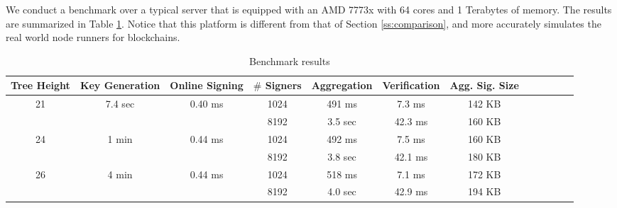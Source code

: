 We conduct a benchmark over a typical server that is equipped with an AMD 7773x with
64 cores and 1 Terabytes of memory.
The results are summarized in Table \ref{tab:bench_results}.
Notice that this platform is different from that of Section \ref{ss:comparison},
and more accurately simulates the real world node runners for blockchains.

\begin{table}[t]\centering
  \begin{tabular}{|c|c|c|c|c|c|c|c|c||c|c|c|}\hline
      Tree Height         & Key Generation            & Online Signing\footnotemark        
      & $\#$ Signers  
                                                                                            &  Aggregation & Verification  & Agg. Sig. Size  \\ \hline\hline
      \multirow{2}{*}{21} & \multirow{2}{*}{7.4 sec}  & \multirow{2}{*}{0.40 ms}  & 1024    &   491 ms     &  7.3 ms       & 142 KB     \\\cline{4-7}
                          &                           &                           & 8192    &   3.5 sec    &  42.3 ms      & 160 KB     \\\hline\hline

      \multirow{2}{*}{24} & \multirow{2}{*}{1 min}    & \multirow{2}{*}{0.44 ms}  & 1024    &   492 ms     &  7.5 ms       & 160 KB     \\\cline{4-7}
                          &                           &                           & 8192    &   3.8 sec    &  42.1 ms      & 180 KB     \\\hline\hline

      \multirow{2}{*}{26} & \multirow{2}{*}{  4 min}  & \multirow{2}{*}{0.44 ms}  & 1024    &   518 ms     &  7.1 ms       & 172 KB     \\\cline{4-7}
                          &                           &                           & 8192    &   4.0 sec    &  42.9 ms      & 194 KB     \\\hline

  \end{tabular}\\
  \caption{Benchmark results}
  \label{tab:bench_results}
\end{table}
